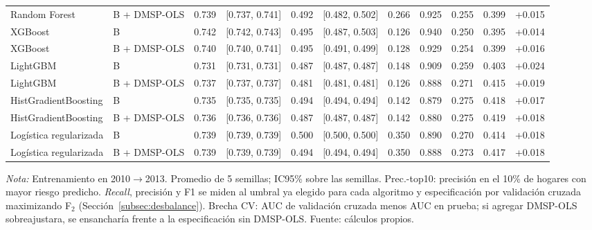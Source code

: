 \begin{table}[H]
{\begin{tabular}{llccccccccc}
    Random Forest            & B + DMSP-OLS    & 0.739 & [0.737, 0.741] & 0.492 & [0.482, 0.502] & 0.266 & 0.925 & 0.255 & 0.399 & +0.015 \\
    \addlinespace
    XGBoost                  & B               & 0.742 & [0.742, 0.743] & 0.495 & [0.487, 0.503] & 0.126 & 0.940 & 0.250 & 0.395 & +0.014 \\
    XGBoost                  & B + DMSP-OLS    & 0.740 & [0.740, 0.741] & 0.495 & [0.491, 0.499] & 0.128 & 0.929 & 0.254 & 0.399 & +0.016 \\
    \addlinespace
    LightGBM                 & B               & 0.731 & [0.731, 0.731] & 0.487 & [0.487, 0.487] & 0.148 & 0.909 & 0.259 & 0.403 & +0.024 \\
    LightGBM                 & B + DMSP-OLS    & 0.737 & [0.737, 0.737] & 0.481 & [0.481, 0.481] & 0.126 & 0.888 & 0.271 & 0.415 & +0.019 \\
    \addlinespace
    HistGradientBoosting     & B               & 0.735 & [0.735, 0.735] & 0.494 & [0.494, 0.494] & 0.142 & 0.879 & 0.275 & 0.418 & +0.017 \\
    HistGradientBoosting     & B + DMSP-OLS    & 0.736 & [0.736, 0.736] & 0.487 & [0.487, 0.487] & 0.142 & 0.880 & 0.275 & 0.419 & +0.018 \\
    \addlinespace
    Logística regularizada   & B               & 0.739 & [0.739, 0.739] & 0.500 & [0.500, 0.500] & 0.350 & 0.890 & 0.270 & 0.414 & +0.018 \\
    Logística regularizada   & B + DMSP-OLS    & 0.739 & [0.739, 0.739] & 0.494 & [0.494, 0.494] & 0.350 & 0.888 & 0.273 & 0.417 & +0.018 \\
    \bottomrule
  \end{tabular}%
  }
  \begin{minipage}{0.95\textwidth}
    \vspace{4pt}
    \footnotesize \textit{Nota:} Entrenamiento en 2010$\to$2013. Promedio de 5 semillas; IC95\% sobre
    las semillas. Prec.-top10: precisión en el 10\% de hogares con mayor riesgo
    predicho. \emph{Recall}, precisión y F1 se miden al umbral ya
    elegido para cada algoritmo y especificación por validación cruzada
    maximizando F$_2$ (Sección~\ref{subsec:desbalance}). Brecha CV: AUC
    de validación cruzada menos AUC en prueba; si agregar DMSP-OLS
    sobreajustara, se ensancharía frente a la especificación sin
    DMSP-OLS. Fuente: cálculos propios.
  \end{minipage}
\end{table}